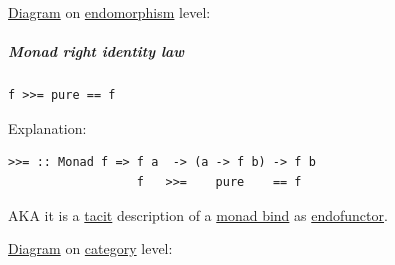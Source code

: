 \documentclass[a4paper,14pt,oneside]{book}
\begin{document}
\hyperref[org4c26854]{Diagram} on \hyperref[orgb62508a]{endomorphism} level:


\subparagraph{\label{org34277fe}Monad right identity law}
\label{sec:orged0e50a}
\begin{verbatim}
f >>= pure == f
\end{verbatim}

Explanation:
\begin{verbatim}
>>= :: Monad f => f a  -> (a -> f b) -> f b
                  f   >>=    pure    == f
\end{verbatim}
AKA it is a \hyperref[orgf45f3c7]{tacit} description of a \hyperref[org6cc373e]{monad bind} as \hyperref[org0976769]{endofunctor}.

\hyperref[org4c26854]{Diagram} on \hyperref[org60c0186]{category} level:
\end{document}
